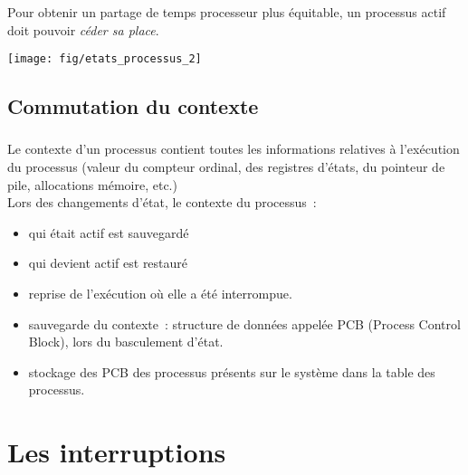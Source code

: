 \begin{frame}
  \frametitle{\insertsubsection} 
  Pour obtenir un partage de temps processeur plus équitable, un processus actif doit
  pouvoir \emph{céder sa place}.
  \vspace{0.5cm}
  
  \begin{minipage}[t]{\linewidth}
    \center
    \texttt{[image: fig/etats\_processus\_2]}
  \end{minipage}
\end{frame}


\subsection{Commutation du contexte}
\begin{frame}
  \frametitle{\insertsubsection}
  Le \alert{contexte} d'un processus contient toutes les informations relatives à
  l'exécution du processus (valeur du \alert{compteur ordinal}, des \alert{registres
    d'états}, du \alert{pointeur de pile}, allocations mémoire, etc.)\\
  \vspace{0.5cm}
  Lors des changements d'état, le contexte du processus~:
  \begin{itemize}
  \item qui était actif est \alert{sauvegardé} 
  \item qui devient actif est \alert{restauré}
  \item[\ding{212}] reprise de l'exécution où elle a été interrompue. 
  \end{itemize}
  \vspace{0.5cm}

\begin{itemize}
  \item[\tiny\ding{110}] sauvegarde du contexte~: structure de données appelée PCB (\alert{Process Control
    Block}), lors du basculement d'état.\\
  \item[\tiny\ding{110}] stockage des PCB des processus présents sur le système dans la \alert{table des processus}.
\end{itemize}
\end{frame}


\section{Les interruptions}

